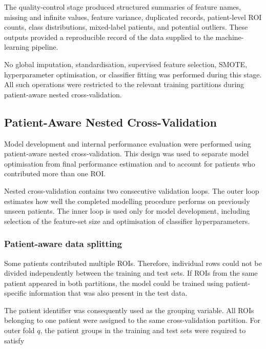 \documentclass[12pt,twocolumn]{article}
\begin{document}
The quality-control stage produced structured summaries of feature
names, missing and infinite values, feature variance, duplicated
records, patient-level ROI counts, class distributions, mixed-label
patients, and potential outliers. These outputs provided a
reproducible record of the data supplied to the machine-learning
pipeline.

No global imputation, standardisation, supervised feature selection,
SMOTE, hyperparameter optimisation, or classifier fitting was
performed during this stage. All such operations were restricted to
the relevant training partitions during patient-aware nested
cross-validation.














\subsection{Patient-Aware Nested Cross-Validation}
\label{subsec:nested_cv}

Model development and internal performance evaluation were performed
using patient-aware nested cross-validation. This design was used to
separate model optimisation from final performance estimation and to
account for patients who contributed more than one ROI.

Nested cross-validation contains two consecutive validation loops. The
outer loop estimates how well the completed modelling procedure
performs on previously unseen patients. The inner loop is used only for
model development, including selection of the feature-set size and
optimisation of classifier hyperparameters.

\subsubsection{Patient-aware data splitting}
\label{subsubsec:patient_aware_splitting}

Some patients contributed multiple ROIs. Therefore, individual rows
could not be divided independently between the training and test sets.
If ROIs from the same patient appeared in both partitions, the model
could be trained using patient-specific information that was also
present in the test data.

The patient identifier was consequently used as the grouping variable.
All ROIs belonging to one patient were assigned to the same
cross-validation partition. For outer fold \(q\), the patient groups in
the training and test sets were required to satisfy
\end{document}
